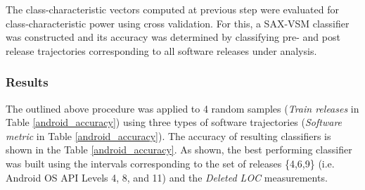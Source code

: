 \begin{table}[t]
\centering
{}
\end{table}

The class-characteristic vectors computed at previous step were evaluated for class-characteristic power using cross validation. For this, a SAX-VSM classifier was constructed and its accuracy was determined by classifying pre- and post release trajectories corresponding to all software releases under analysis.

\subsubsection{Results}
The outlined above procedure was applied to 4 random samples (\textit{Train releases} in Table  \ref{android_accuracy}) using three types of software trajectories (\textit{Software metric} in Table  \ref{android_accuracy}). The accuracy of resulting classifiers is shown in the Table  \ref{android_accuracy}. As shown, the best performing classifier was built using the intervals corresponding to the set of releases \{4,6,9\} (i.e. Android OS API Levels 4, 8, and 11) and the \textit{Deleted LOC} measurements.

